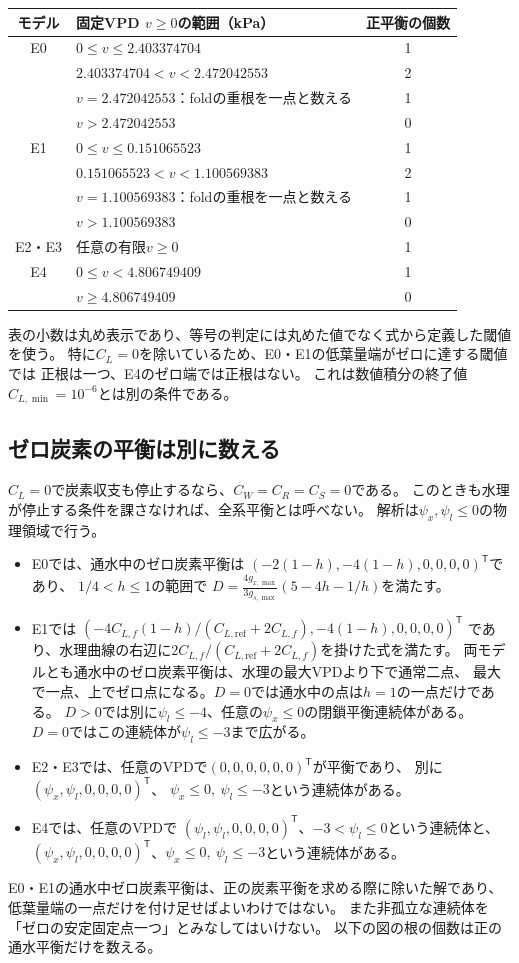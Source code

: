 \documentclass[a4paper,11pt]{ltjsarticle}
\newcommand{\tr}{^{\mathsf T}}
\begin{document}
\begin{center}\small
\begin{tabular}{c p{.68\linewidth} c}\toprule
モデル&固定VPD $v\geq0$の範囲（kPa）&正平衡の個数\\\midrule
E0&$0\leq v\leq2.403374704$&1\\
&$2.403374704<v<2.472042553$&2\\
&$v=2.472042553$：foldの重根を一点と数える&1\\
&$v>2.472042553$&0\\\midrule
E1&$0\leq v\leq0.151065523$&1\\
&$0.151065523<v<1.100569383$&2\\
&$v=1.100569383$：foldの重根を一点と数える&1\\
&$v>1.100569383$&0\\\midrule
E2・E3&任意の有限$v\geq0$&1\\\midrule
E4&$0\leq v<4.806749409$&1\\
&$v\geq4.806749409$&0\\\bottomrule
\end{tabular}
\end{center}
表の小数は丸め表示であり、等号の判定には丸めた値でなく式から定義した閾値を使う。
特に$C_L=0$を除いているため、E0・E1の低葉量端がゼロに達する閾値では
正根は一つ、E4のゼロ端では正根はない。
これは数値積分の終了値$C_{L,\min}=10^{-6}$とは別の条件である。

\subsection{ゼロ炭素の平衡は別に数える}
$C_L=0$で炭素収支も停止するなら、$C_W=C_R=C_S=0$である。
このときも水理が停止する条件を課さなければ、全系平衡とは呼べない。
解析は$\psi_x,\psi_l\leq0$の物理領域で行う。
\begin{itemize}
 \item E0では、通水中のゼロ炭素平衡は
 $(-2(1-h),-4(1-h),0,0,0,0)\tr$であり、
 $1/4<h\leq1$の範囲で
 $D=\frac{4g_{x,\max}}{3g_{s,\max}}(5-4h-1/h)$を満たす。
 \item E1では
 $(-4C_{L,f}(1-h)/(C_{L,\mathrm{ref}}+2C_{L,f}),-4(1-h),0,0,0,0)\tr$
 であり、水理曲線の右辺に$2C_{L,f}/(C_{L,\mathrm{ref}}+2C_{L,f})$を掛けた式を満たす。
 両モデルとも通水中のゼロ炭素平衡は、水理の最大VPDより下で通常二点、
 最大で一点、上でゼロ点になる。$D=0$では通水中の点は$h=1$の一点だけである。
 $D>0$では別に$\psi_l\leq-4$、任意の$\psi_x\leq0$の閉鎖平衡連続体がある。
 $D=0$ではこの連続体が$\psi_l\leq-3$まで広がる。
 \item E2・E3では、任意のVPDで$(0,0,0,0,0,0)\tr$が平衡であり、
 別に$(\psi_x,\psi_l,0,0,0,0)\tr$、
 $\psi_x\leq0,\ \psi_l\leq-3$という連続体がある。
 \item E4では、任意のVPDで
 $(\psi_l,\psi_l,0,0,0,0)\tr$、$-3<\psi_l\leq0$という連続体と、
 $(\psi_x,\psi_l,0,0,0,0)\tr$、$\psi_x\leq0,\ \psi_l\leq-3$という連続体がある。
\end{itemize}
E0・E1の通水中ゼロ炭素平衡は、正の炭素平衡を求める際に除いた解であり、
低葉量端の一点だけを付け足せばよいわけではない。
また非孤立な連続体を「ゼロの安定固定点一つ」とみなしてはいけない。
以下の図の根の個数は正の通水平衡だけを数える。
\end{document}
